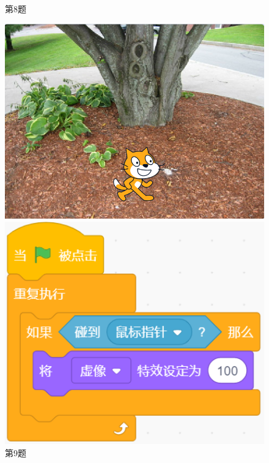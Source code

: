 \documentclass[10pt, a4paper]{article}
\begin{document}
\begin{enumerate}
\begin{figure}[htbp]
\begin{minipage}[t]{.4\textwidth}
\begin{minipage}[t]{.45\textwidth}
                \end{minipage}
                \caption*{第8题}
            \end{minipage}
            \begin{minipage}[t]{.4\textwidth}
                \centering
                \begin{minipage}[t]{.45\textwidth}
                    \centering
                    \includegraphics[width=\textwidth]{9-1.png}
                \end{minipage}
                \begin{minipage}[t]{.45\textwidth}
                    \centering
                    \includegraphics[width=1\textwidth]{9-2.png}
                \end{minipage}
                \caption*{第9题}
            \end{minipage}
        \end{figure}


\end{enumerate}
\end{document}
